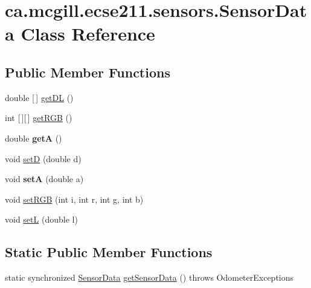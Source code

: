 \hypertarget{classca_1_1mcgill_1_1ecse211_1_1sensors_1_1_sensor_data}{}\section{ca.\+mcgill.\+ecse211.\+sensors.\+Sensor\+Data Class Reference}
\label{classca_1_1mcgill_1_1ecse211_1_1sensors_1_1_sensor_data}
\subsection*{Public Member Functions}
\begin{DoxyCompactItemize}
\item 
double \mbox{[}$\,$\mbox{]} \hyperlink{classca_1_1mcgill_1_1ecse211_1_1sensors_1_1_sensor_data_a4e0eabd547726c90bd0b7252557d7ad7}{get\+DL} ()
\item 
int \mbox{[}$\,$\mbox{]}\mbox{[}$\,$\mbox{]} \hyperlink{classca_1_1mcgill_1_1ecse211_1_1sensors_1_1_sensor_data_a0abd08431dae67c7ee0e7a18b5305f91}{get\+R\+GB} ()
\item 
\mbox{\label{classca_1_1mcgill_1_1ecse211_1_1sensors_1_1_sensor_data_a7ad543db5c907b4bd3329dbb34b4e9d9}} 
double {\bfseries getA} ()
\item 
void \hyperlink{classca_1_1mcgill_1_1ecse211_1_1sensors_1_1_sensor_data_ae20bf127c57dcfcb3b7632ca05b6d482}{setD} (double d)
\item 
\mbox{\label{classca_1_1mcgill_1_1ecse211_1_1sensors_1_1_sensor_data_a9828d8b4dfb9b197e8fd149fb7deb63b}} 
void {\bfseries setA} (double a)
\item 
void \hyperlink{classca_1_1mcgill_1_1ecse211_1_1sensors_1_1_sensor_data_ae5e2528566b53218673ebc1ae4683204}{set\+R\+GB} (int i, int r, int g, int b)
\item 
void \hyperlink{classca_1_1mcgill_1_1ecse211_1_1sensors_1_1_sensor_data_aeafd49ce71819e8e1a5d5ff6287e7819}{setL} (double l)
\end{DoxyCompactItemize}
\subsection*{Static Public Member Functions}
\begin{DoxyCompactItemize}
\item 
static synchronized \hyperlink{classca_1_1mcgill_1_1ecse211_1_1sensors_1_1_sensor_data}{Sensor\+Data} \hyperlink{classca_1_1mcgill_1_1ecse211_1_1sensors_1_1_sensor_data_ab8aef4bdb5d9f3dad399656e00af2539}{get\+Sensor\+Data} ()  throws Odometer\+Exceptions 
\end{DoxyCompactItemize}
